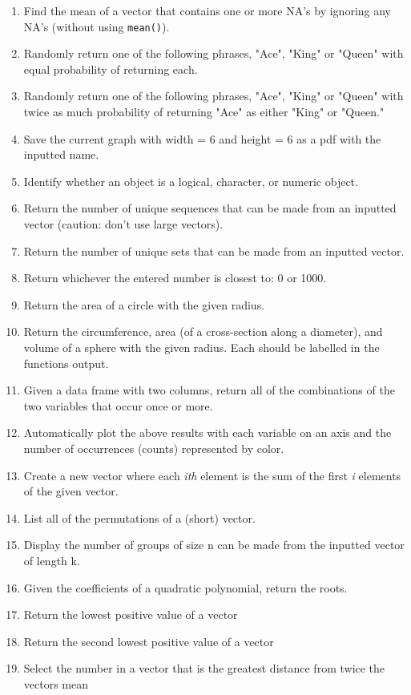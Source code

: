 \documentclass{article}
\begin{document}
\begin{enumerate}
\item Find the mean of a vector that contains one or more NA's by ignoring any NA's (without using \verb!mean()!).
\item Randomly return one of the following phrases, "Ace", "King" or "Queen" with equal probability of returning each.
\item Randomly return one of the following phrases, "Ace", "King" or "Queen" with twice as much probability of returning "Ace" as either "King" or "Queen."
\item Save the current graph with width = 6 and height = 6 as a pdf with the inputted name.
\item Identify whether an object is a logical, character, or numeric object.
\item Return the number of unique sequences that can be made from an inputted vector (caution: don't use large vectors).
\item Return the number of unique sets that can be made from an inputted vector.
\item Return whichever the entered number is closest to: 0 or 1000.
\item Return the area of a circle with the given radius.
\item Return the circumference, area (of a cross-section along a diameter), and volume of a sphere with the given radius. Each should be labelled in the functions output.
\item Given a data frame with two columns, return all of the combinations of the two variables that occur once or more.
\item Automatically plot the above results with each variable on an axis and the number of occurrences (counts) represented by color.
\item Create a new vector where each \emph{ith} element is the sum of the first \emph{i} elements of the given vector.
\item List all of the permutations of a (short) vector.
\item Display the number of groups of size n can be made from the inputted vector of length k.
\item Given the coefficients of a quadratic polynomial, return the roots.
\item Return the lowest positive value of a vector
\item Return the second lowest positive value of a vector
\item Select the number in a vector that is the greatest distance from twice the vectors mean

\end{enumerate}
\end{document}
